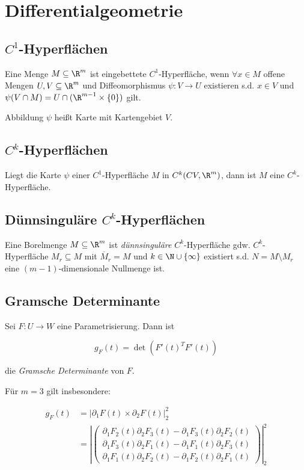\section*{Differentialgeometrie}

\subsection*{$C^1$-Hyperflächen}

Eine Menge $M \subseteq \R^m$ ist eingebettete $C^1$-Hyperfläche, wenn $\forall x \in M$ offene Mengen $U, V \subseteq \R^m$ und Diffeomorphismus $\psi : V \to U$ existieren s.d. $x \in V$ und $\psi(V \cap M) = U \cap (\R^{m-1} \times \{0\})$ gilt.

\spacing

Abbildung $\psi$ heißt Karte mit Kartengebiet $V$.

\subsection*{$C^k$-Hyperflächen}

Liegt die Karte $\psi$ einer $C^1$-Hyperfläche $M$ in $C^k(CV,\R^m)$, dann ist $M$ eine $C^k$-Hyperfläche.

\subsection*{Dünnsinguläre $C^k$-Hyperflächen}

Eine Borelmenge $M \subseteq \R^m$ ist \emph{dünnsinguläre} $C^k$-Hyperfläche gdw. $C^k$-Hyperfläche $M_r \subseteq M$ mit $\overline M_r = M$ und $k \in \N \cup \{\infty\}$ existiert s.d. $N = M \setminus M_r$ eine $(m-1)$-dimensionale Nullmenge ist.

\subsection*{Gramsche Determinante}

Sei $F : U \to W$ eine Parametrisierung. Dann ist

\vspace{-2mm}
$$g_F(t) = \det(F'(t)^TF'(t))$$

die \emph{Gramsche Determinante} von $F$.

\spacing

Für $m = 3$ gilt insbesondere:

\vspace{-4mm}
\begin{align*}
g_F(t) &= |\partial_1F(t) \times \partial_2F(t)|_2^2\\
       &= \left|\begin{pmatrix}
	\partial_1 F_2(t) \partial_2 F_3(t) - \partial_1 F_3(t) \partial_2 F_2(t) \\
	\partial_1 F_3(t) \partial_2 F_1(t) - \partial_1 F_1(t) \partial_2 F_3(t) \\
	\partial_1 F_1(t) \partial_2 F_2(t) - \partial_1 F_2(t) \partial_2 F_1(t)
\end{pmatrix}\right|_2^2
\end{align*}

